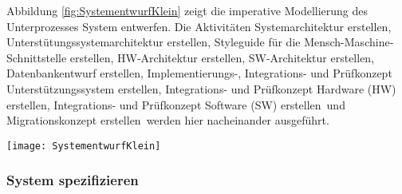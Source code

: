 Abbildung \ref{fig:SystementwurfKlein} zeigt die imperative Modellierung des Unterprozesses \grqq System entwerfen\grqq.\newline
Die Aktivitäten \grqq Systemarchitektur erstellen, Unterstütungssystemarchitektur erstellen, Styleguide für die Mensch-Maschine-Schnittstelle erstellen, HW-Architektur erstellen, SW-Architektur erstellen, Datenbankentwurf erstellen, Implementierungs-, Integrations- und Prüfkonzept Unterstützungssystem erstellen, Integrations- und Prüfkonzept Hardware (HW) erstellen, Integrations- und Prüfkonzept Software (SW) erstellen\grqq \ und \grqq Migrationskonzept erstellen\grqq \ werden hier nacheinander ausgeführt.
\begin{sidewaysfigure}[!htbp]
\begin{center}
  \texttt{[image: SystementwurfKlein]} %
  \caption{System entwerfen V-Modell XT - imperativ}
  \label{fig:SystementwurfKlein}
\end{center}
\end{sidewaysfigure}


\subsubsection{System spezifizieren}

